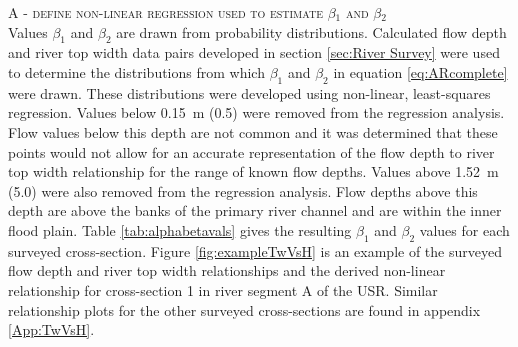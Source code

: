 \begin{linenumbers}
\textsc{A - define non-linear regression used to estimate $\beta_1$ and $\beta_2$}\\
Values $\beta_1$ and $\beta_2$ are drawn from probability distributions.  Calculated flow depth and river top width data pairs developed in section \ref{sec:River Survey} were used to determine the distributions from which $\beta_1$ and $\beta_2$ in equation \ref{eq:ARcomplete} were drawn.  These distributions were developed using non-linear, least-squares regression.  Values below \SI{0.15}{\meter} (\SI{0.5}{\foot}) were removed from the regression analysis.  Flow values below this depth are not common and it was determined that these points would not allow for an accurate representation of the flow depth to river top width relationship for the range of known flow depths.  Values above \SI{1.52}{\meter} (\SI{5.0}{\foot}) were also removed from the regression analysis.  Flow depths above this depth are above the banks of the primary river channel and are within the inner flood plain.  Table \ref{tab:alphabetavals} gives the resulting $\beta_1$ and $\beta_2$ values for each surveyed cross-section.  Figure \ref{fig:exampleTwVsH} is an example of the surveyed flow depth and river top width relationships and the derived non-linear relationship for cross-section 1 in river segment A of the USR.  Similar relationship plots for the other surveyed cross-sections are found in appendix \ref{App:TwVsH}.  


\end{linenumbers}
